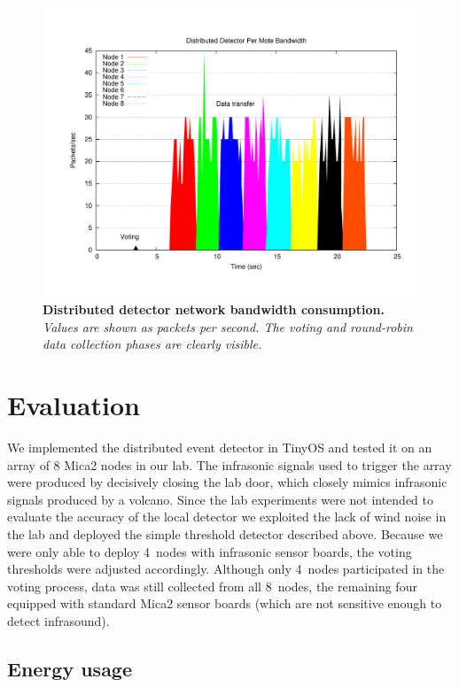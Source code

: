 \begin{figure}[t]
\begin{center}
\includegraphics[width=0.9\hsize]{./figures/DD/bandwidth.pdf}
\end{center}
\caption{\small {\bf Distributed detector network bandwidth
consumption.} {\em Values are shown as packets per second. The 
voting and round-robin data collection phases are clearly visible.}}
\label{fig-packetssec}
\end{figure}

\section{Evaluation}
\label{sec-evaluation}

We implemented the distributed event detector in TinyOS and tested it
on an array of 8 Mica2 nodes in our lab.  The infrasonic signals used
to trigger the array were produced by decisively closing the lab door, 
which closely mimics infrasonic signals produced by a volcano.  Since the
lab experiments were not intended to evaluate the accuracy of the local
detector we exploited the lack of wind noise in the lab and deployed the
simple threshold detector described above.  Because we were only able
to deploy 4~nodes with infrasonic sensor boards, the voting thresholds were
adjusted accordingly.  Although only 4~nodes participated in the voting
process, data was still collected from all 8~nodes, the remaining four
equipped with standard Mica2 sensor boards (which are not sensitive 
enough to detect infrasound).

\subsection{Energy usage}

